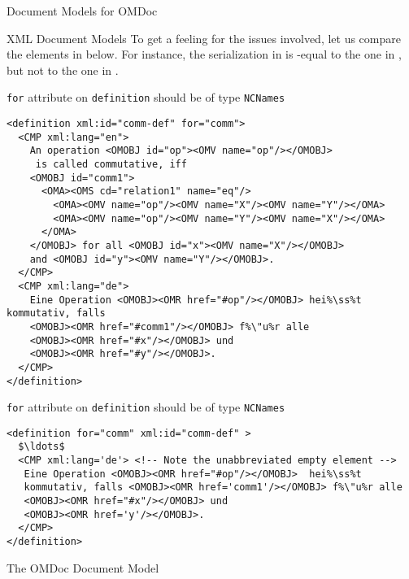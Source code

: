 \begin{tchapter}[id=document-model]{Document Models for OMDoc}
\begin{tsection}[id=xml-DOM]{XML Document Models}
To get a feeling for the issues involved, let us compare the {\omdoc} elements in
{} below. For instance, the serialization in {}
is {\xml}-equal to the one in {}, but not to the one in
{}.

\begin{erratum}[reported-by=Michael Kohlhase,date=2009-08-11]{{\texttt{for}} attribute on
    {\texttt{definition}} should be of type {\texttt{NCNames}}}
\begin{lstlisting}[escapechar=\%,label=lst:first,
   index={definition,CMP,OMOBJ,OMA},caption={An {\omdoc} Definition}]
<definition xml:id="comm-def" for="comm">
  <CMP xml:lang="en">
    An operation <OMOBJ id="op"><OMV name="op"/></OMOBJ>
     is called commutative, iff 
    <OMOBJ id="comm1">
      <OMA><OMS cd="relation1" name="eq"/>
        <OMA><OMV name="op"/><OMV name="X"/><OMV name="Y"/></OMA>
        <OMA><OMV name="op"/><OMV name="Y"/><OMV name="X"/></OMA>
      </OMA>
    </OMOBJ> for all <OMOBJ id="x"><OMV name="X"/></OMOBJ> 
    and <OMOBJ id="y"><OMV name="Y"/></OMOBJ>.
  </CMP>
  <CMP xml:lang="de">
    Eine Operation <OMOBJ><OMR href="#op"/></OMOBJ> hei%\ss%t kommutativ, falls 
    <OMOBJ><OMR href="#comm1"/></OMOBJ> f%\"u%r alle 
    <OMOBJ><OMR href="#x"/></OMOBJ> und 
    <OMOBJ><OMR href="#y"/></OMOBJ>.
  </CMP>
</definition>
\end{lstlisting}
\end{erratum}

\begin{erratum}[reported-by=Michael Kohlhase,date=2009-08-11]{{\texttt{for}} attribute on
    {\texttt{definition}} should be of type {\texttt{NCNames}}}
\begin{lstlisting}[escapechar=\%,label=lst:second,mathescape,
   index={definition,CMP,OMOBJ},
   caption={An {\xml}-equal serialization for {\mylstref{first}}}]
<definition for="comm" xml:id="comm-def" >
  $\ldots$
  <CMP xml:lang='de'> <!-- Note the unabbreviated empty element -->
   Eine Operation <OMOBJ><OMR href="#op"/></OMOBJ>  hei%\ss%t 
   kommutativ, falls <OMOBJ><OMR href='comm1'/></OMOBJ> f%\"u%r alle 
   <OMOBJ><OMR href="#x"/></OMOBJ> und 
   <OMOBJ><OMR href='y'/></OMOBJ>.
  </CMP>
</definition>
\end{lstlisting}
\end{erratum}
\end{tsection}

\begin{tsection}[id=omdom]{The OMDoc Document Model}


\end{tsection}
\end{tchapter}

